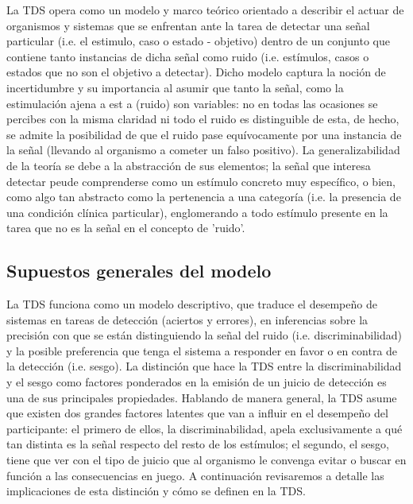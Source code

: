 La TDS opera como un modelo y marco teórico orientado a describir el actuar de organismos y sistemas que se enfrentan ante la tarea de detectar una señal particular (i.e. el estimulo, caso o estado - objetivo) dentro de un conjunto que contiene tanto instancias de dicha señal como ruido (i.e. estímulos, casos o estados que no son el objetivo a detectar). Dicho modelo captura la noción de incertidumbre y su importancia al asumir que tanto la señal, como la estimulación ajena a est a (ruido) son variables: no en todas las ocasiones se percibes con la misma claridad ni todo el ruido es distinguible de esta, de hecho, se admite la posibilidad de que el ruido pase equívocamente por una instancia de la señal (llevando al organismo a cometer un falso positivo). La generalizabilidad de la teoría se debe a la abstracción de sus elementos; la señal que interesa detectar peude comprenderse como un estímulo concreto muy específico, o bien, como algo tan abstracto como la pertenencia a una categoría (i.e. la presencia de una condición clínica particular), englomerando a todo estímulo presente en la tarea que no es la señal en el concepto de 'ruido'.  \\ 

\subsection{Supuestos generales del modelo}

La TDS funciona como un modelo descriptivo, que traduce el desempeño de sistemas en tareas de detección (aciertos y errores), en inferencias sobre la precisión con que se están distinguiendo la señal del ruido (i.e. discriminabilidad) y la posible preferencia que tenga el sistema a responder en favor o en contra de la detección (i.e. sesgo). La distinción que hace la TDS entre la discriminabilidad y el sesgo como factores ponderados en la emisión de un juicio de detección es una de sus principales propiedades. Hablando de manera general, la TDS asume que existen dos grandes factores latentes que van a influir en el desempeño del participante: el primero de ellos, la discriminabilidad, apela exclusivamente a qué tan distinta es la señal respecto del resto de los estímulos; el segundo, el sesgo, tiene que ver con el tipo de juicio que al organismo le convenga evitar o buscar en función a las consecuencias en juego. A continuación revisaremos a detalle las implicaciones de esta distinción y cómo se definen en la TDS.\\

